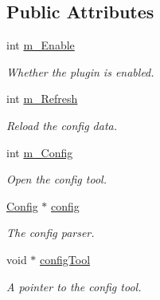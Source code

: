 \subsection*{Public Attributes}
\begin{DoxyCompactItemize}
\item 
\mbox{\label{classCVDJartnet_ae8cb7dd606f4412ccd5c3027945bb6c6}} 
int \hyperlink{classCVDJartnet_ae8cb7dd606f4412ccd5c3027945bb6c6}{m\+\_\+\+Enable}
\begin{DoxyCompactList}\small\item\em Whether the plugin is enabled. \end{DoxyCompactList}\item 
\mbox{\label{classCVDJartnet_ac441cca0ec16ec5d572a7b34fef7f134}} 
int \hyperlink{classCVDJartnet_ac441cca0ec16ec5d572a7b34fef7f134}{m\+\_\+\+Refresh}
\begin{DoxyCompactList}\small\item\em Reload the config data. \end{DoxyCompactList}\item 
\mbox{\label{classCVDJartnet_a686ac746d631a668272ad5f87b2f4db2}} 
int \hyperlink{classCVDJartnet_a686ac746d631a668272ad5f87b2f4db2}{m\+\_\+\+Config}
\begin{DoxyCompactList}\small\item\em Open the config tool. \end{DoxyCompactList}\item 
\mbox{\label{classCVDJartnet_a817d2020541e2af6e0833a061d352fae}} 
\hyperlink{classConfig}{Config} $\ast$ \hyperlink{classCVDJartnet_a817d2020541e2af6e0833a061d352fae}{config}
\begin{DoxyCompactList}\small\item\em The config parser. \end{DoxyCompactList}\item 
void $\ast$ \hyperlink{classCVDJartnet_ab24b02521183e5d8cf6884e64b3b6e27}{config\+Tool}
\begin{DoxyCompactList}\small\item\em A pointer to the config tool. \end{DoxyCompactList}\end{DoxyCompactItemize}
